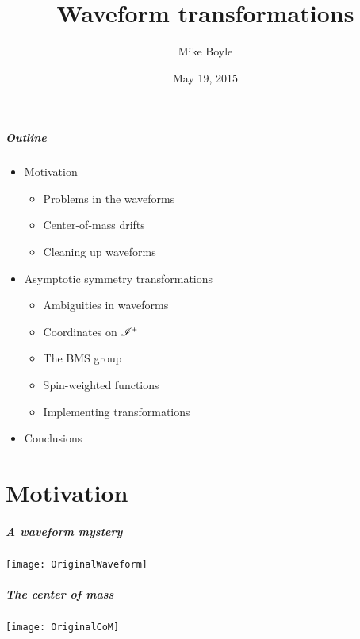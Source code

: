 \documentclass[12pt,xcolor={dvipsnames}]{beamer}
\title{Waveform transformations}
\author[Mike Boyle] {Mike Boyle}
\date{May 19, 2015}
\begin{document}
\begin{frame}[plain]
  \titlepage
\end{frame}



\begin{frame}
  \frametitle{Outline}
  \begin{itemize}
  \item Motivation
    \begin{itemize}
    \item Problems in the waveforms
    \item Center-of-mass drifts
    \item Cleaning up waveforms
    \end{itemize}
  \item Asymptotic symmetry transformations
    \begin{itemize}
    \item Ambiguities in waveforms
    \item Coordinates on $\mathscr{I}^{+}$
    \item The BMS group
    \item Spin-weighted functions
    \item Implementing transformations
    \end{itemize}
  \item Conclusions
  \end{itemize}
\end{frame}



\part{Motivation}
\partpage


\begin{frame}
  \frametitle{A waveform mystery}
  \texttt{[image: OriginalWaveform]}
\end{frame}

\begin{frame}
  \frametitle{The center of mass}
  \texttt{[image: OriginalCoM]}
\end{frame}
\end{document}
